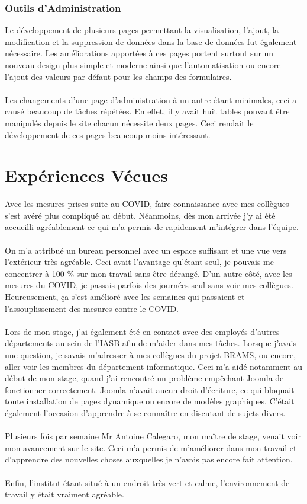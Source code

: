 \documentclass[11pt]{article}
\begin{document}
\subsubsection{Outils d'Administration}

Le développement de plusieurs pages permettant la visualisation, l'ajout, la modification et la suppression de données dans la base de données fut également nécessaire.
Les améliorations apportées à ces pages portent surtout sur un nouveau design plus simple et moderne ainsi que l'automatisation ou encore l'ajout des valeurs par défaut pour les champs des formulaires.\\
\\
Les changements d'une page d'administration à un autre étant minimales, ceci a causé beaucoup de tâches répétées.
En effet, il y avait huit tables pouvant être manipulés depuis le site chacun nécessite deux pages.
Ceci rendait le développement de ces pages beaucoup moins intéressant.

\newpage

\section{Expériences Vécues}

Avec les mesures prises suite au COVID, faire connaissance avec mes collègues s'est avéré plus compliqué au début.
Néanmoins, dès mon arrivée j'y ai été accueilli agréablement ce qui m'a permis de rapidement m'intégrer dans l'équipe.\\
\\
On m'a attribué un bureau personnel avec un espace suffisant et une vue vers l'extérieur très agréable.
Ceci avait l'avantage qu'étant seul, je pouvais me concentrer à 100 \% sur mon travail sans être dérangé.
D'un autre côté, avec les mesures du COVID, je passais parfois des journées seul sans voir mes collègues.
Heureusement, ça s'est amélioré avec les semaines qui passaient et l'assouplissement des mesures contre le COVID.\\
\\
Lors de mon stage, j'ai également été en contact avec des employés d'autres départements au sein de l'IASB afin de m'aider dans mes tâches.
Lorsque j'avais une question, je savais m'adresser à mes collègues du projet BRAMS, ou encore, aller voir les membres du département informatique.
Ceci m'a aidé notamment au début de mon stage, quand j'ai rencontré un problème empêchant Joomla de fonctionner correctement.
Joomla n'avait aucun droit d'écriture, ce qui bloquait toute installation de pages dynamique ou encore de modèles graphiques.
C'était également l'occasion d'apprendre à se connaître en discutant de sujets divers.\\
\\
Plusieurs fois par semaine Mr Antoine Calegaro, mon maître de stage, venait voir mon avancement sur le site.
Ceci m'a permis de m'améliorer dans mon travail et d'apprendre des nouvelles choses auxquelles je n'avais pas encore fait attention.\\
\\
Enfin, l'institut étant situé à un endroit très vert et calme, l'environnement de travail y était vraiment agréable.
\end{document}
